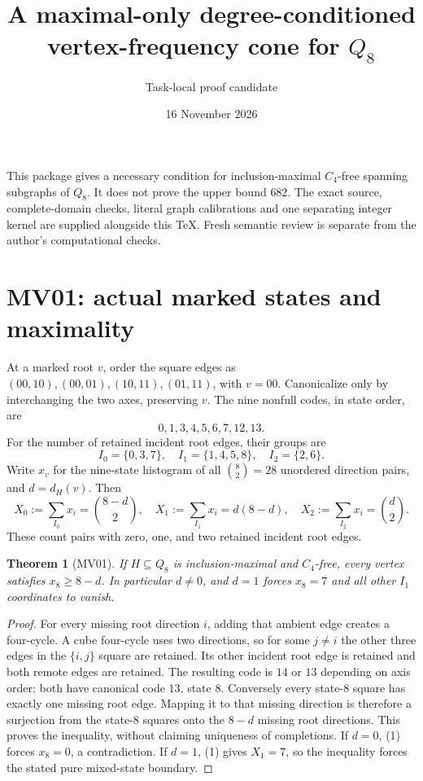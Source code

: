 \documentclass[11pt]{article}
\newtheorem{theorem}{Theorem}
\begin{document}
\title{A maximal-only degree-conditioned vertex-frequency cone for $Q_8$}
\author{Task-local proof candidate}
\date{16 November 2026}
\maketitle
This package gives a necessary condition for inclusion-maximal $C_4$-free
spanning subgraphs of $Q_8$. It does not prove the upper bound $682$.
The exact source, complete-domain checks, literal graph calibrations and
one separating integer kernel are supplied alongside this TeX.
Fresh semantic review is separate from the author's computational checks.

\section{MV01: actual marked states and maximality}
At a marked root $v$, order the square edges as
$(00,10),(00,01),(10,11),(01,11)$, with $v=00$.
Canonicalize only by interchanging the two axes, preserving $v$.
The nine nonfull codes, in state order, are
\[
 0,1,3,4,5,6,7,12,13.
\]
For the number of retained incident root edges, their groups are
\[
 I_0=\{0,3,7\},\quad I_1=\{1,4,5,8\},\quad I_2=\{2,6\}.
\]
Write $x_v$ for the nine-state histogram of all $\binom82=28$
unordered direction pairs, and $d=d_H(v)$. Then
\[
 X_0:=\sum_{I_0}x_i=\binom{8-d}{2},\quad
 X_1:=\sum_{I_1}x_i=d(8-d),\quad
 X_2:=\sum_{I_2}x_i=\binom d2.                 \tag{1}
\]
These count pairs with zero, one, and two retained incident root edges.

\begin{theorem}[MV01]
If $H\subseteq Q_8$ is inclusion-maximal and $C_4$-free, every vertex
satisfies $x_8\ge8-d$. In particular $d\ne0$, and $d=1$ forces
$x_8=7$ and all other $I_1$ coordinates to vanish.
\end{theorem}
\begin{proof}
For every missing root direction $i$, adding that ambient edge creates
a four-cycle. A cube four-cycle uses two directions, so for some $j\ne i$
the other three edges in the $\{i,j\}$ square are retained.
Its other incident root edge is retained and both remote edges are
retained. The resulting code is $14$ or $13$ depending on axis order;
both have canonical code $13$, state $8$.
Conversely every state-$8$ square has exactly one missing root edge.
Mapping it to that missing direction is therefore a surjection from
the state-$8$ squares onto the $8-d$ missing root directions. This
proves the inequality, without claiming uniqueness of completions.
If $d=0$, (1) forces $x_8=0$, a contradiction. If $d=1$, (1) gives
$X_1=7$, so the inequality forces the stated pure mixed-state boundary.
\end{proof}
\end{document}

